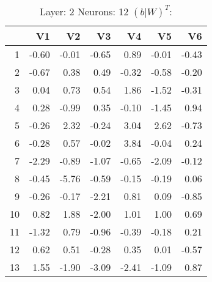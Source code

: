 \begin{table}[ht]
\centering
\begin{tabular}{rrrrrrr}
  \hline
 & V1 & V2 & V3 & V4 & V5 & V6 \\ 
  \hline
1 & -0.60 & -0.01 & -0.65 & 0.89 & -0.01 & -0.43 \\ 
  2 & -0.67 & 0.38 & 0.49 & -0.32 & -0.58 & -0.20 \\ 
  3 & 0.04 & 0.73 & 0.54 & 1.86 & -1.52 & -0.31 \\ 
  4 & 0.28 & -0.99 & 0.35 & -0.10 & -1.45 & 0.94 \\ 
  5 & -0.26 & 2.32 & -0.24 & 3.04 & 2.62 & -0.73 \\ 
  6 & -0.28 & 0.57 & -0.02 & 3.84 & -0.04 & 0.24 \\ 
  7 & -2.29 & -0.89 & -1.07 & -0.65 & -2.09 & -0.12 \\ 
  8 & -0.45 & -5.76 & -0.59 & -0.15 & -0.19 & 0.06 \\ 
  9 & -0.26 & -0.17 & -2.21 & 0.81 & 0.09 & -0.85 \\ 
  10 & 0.82 & 1.88 & -2.00 & 1.01 & 1.00 & 0.69 \\ 
  11 & -1.32 & 0.79 & -0.96 & -0.39 & -0.18 & 0.21 \\ 
  12 & 0.62 & 0.51 & -0.28 & 0.35 & 0.01 & -0.57 \\ 
  13 & 1.55 & -1.90 & -3.09 & -2.41 & -1.09 & 0.87 \\ 
   \hline
\end{tabular}
\caption{Layer: 2 Neurons: 12  $(b|W)^T$: 
} 
\end{table}
